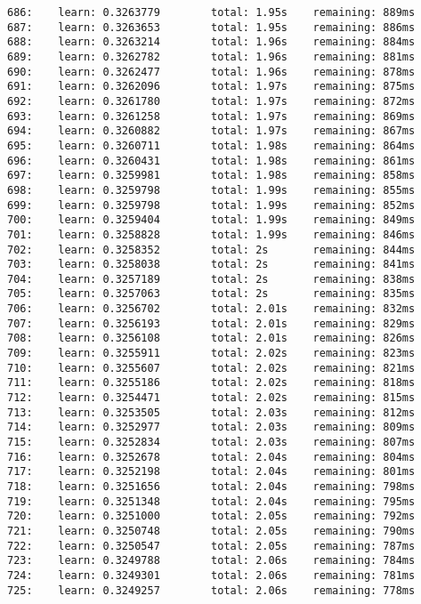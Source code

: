 \documentclass[11pt]{article}
\begin{document}
\begin{Verbatim}[commandchars=\\\{\}]
686:    learn: 0.3263779        total: 1.95s    remaining: 889ms
687:    learn: 0.3263653        total: 1.95s    remaining: 886ms
688:    learn: 0.3263214        total: 1.96s    remaining: 884ms
689:    learn: 0.3262782        total: 1.96s    remaining: 881ms
690:    learn: 0.3262477        total: 1.96s    remaining: 878ms
691:    learn: 0.3262096        total: 1.97s    remaining: 875ms
692:    learn: 0.3261780        total: 1.97s    remaining: 872ms
693:    learn: 0.3261258        total: 1.97s    remaining: 869ms
694:    learn: 0.3260882        total: 1.97s    remaining: 867ms
695:    learn: 0.3260711        total: 1.98s    remaining: 864ms
696:    learn: 0.3260431        total: 1.98s    remaining: 861ms
697:    learn: 0.3259981        total: 1.98s    remaining: 858ms
698:    learn: 0.3259798        total: 1.99s    remaining: 855ms
699:    learn: 0.3259798        total: 1.99s    remaining: 852ms
700:    learn: 0.3259404        total: 1.99s    remaining: 849ms
701:    learn: 0.3258828        total: 1.99s    remaining: 846ms
702:    learn: 0.3258352        total: 2s       remaining: 844ms
703:    learn: 0.3258038        total: 2s       remaining: 841ms
704:    learn: 0.3257189        total: 2s       remaining: 838ms
705:    learn: 0.3257063        total: 2s       remaining: 835ms
706:    learn: 0.3256702        total: 2.01s    remaining: 832ms
707:    learn: 0.3256193        total: 2.01s    remaining: 829ms
708:    learn: 0.3256108        total: 2.01s    remaining: 826ms
709:    learn: 0.3255911        total: 2.02s    remaining: 823ms
710:    learn: 0.3255607        total: 2.02s    remaining: 821ms
711:    learn: 0.3255186        total: 2.02s    remaining: 818ms
712:    learn: 0.3254471        total: 2.02s    remaining: 815ms
713:    learn: 0.3253505        total: 2.03s    remaining: 812ms
714:    learn: 0.3252977        total: 2.03s    remaining: 809ms
715:    learn: 0.3252834        total: 2.03s    remaining: 807ms
716:    learn: 0.3252678        total: 2.04s    remaining: 804ms
717:    learn: 0.3252198        total: 2.04s    remaining: 801ms
718:    learn: 0.3251656        total: 2.04s    remaining: 798ms
719:    learn: 0.3251348        total: 2.04s    remaining: 795ms
720:    learn: 0.3251000        total: 2.05s    remaining: 792ms
721:    learn: 0.3250748        total: 2.05s    remaining: 790ms
722:    learn: 0.3250547        total: 2.05s    remaining: 787ms
723:    learn: 0.3249788        total: 2.06s    remaining: 784ms
724:    learn: 0.3249301        total: 2.06s    remaining: 781ms
725:    learn: 0.3249257        total: 2.06s    remaining: 778ms

\end{Verbatim}
\end{document}
